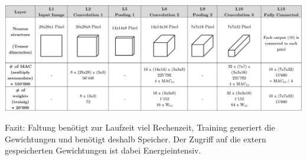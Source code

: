 \begin{center}
		\includegraphics[width=\textwidth]{../fig/cnn_overview}
\end{center}
Fazit: Faltung benötigt zur Laufzeit viel Rechenzeit, Training generiert die Gewichtungen 
und benötigt deshalb Speicher. Der Zugriff auf die extern gespeicherten Gewichtungen ist 
dabei Energieintensiv. 

